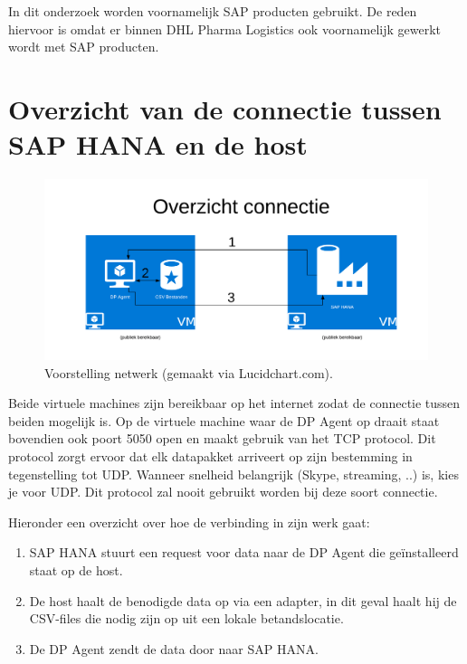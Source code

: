 In dit onderzoek worden voornamelijk SAP producten gebruikt. De reden hiervoor is omdat er binnen DHL Pharma Logistics ook voornamelijk gewerkt wordt met SAP producten.

\section{Overzicht van de connectie tussen SAP HANA en de host}
\begin{figure}[h]
	\centering
	\includegraphics[scale=0.5]{../images/AzureConnectieBP.png}
	\caption{Voorstelling netwerk (gemaakt via Lucidchart.com).}
	\label{fig:azureconn}
\end{figure}

Beide virtuele machines zijn bereikbaar op het internet zodat de connectie tussen beiden mogelijk is. Op de virtuele machine waar de DP Agent op draait staat bovendien ook poort 5050 open en maakt gebruik van het TCP protocol. Dit protocol zorgt ervoor dat elk datapakket arriveert op zijn bestemming in tegenstelling tot UDP. Wanneer snelheid belangrijk (Skype, streaming, ..) is, kies je voor UDP. Dit protocol zal nooit gebruikt worden bij deze soort connectie.

Hieronder een overzicht over hoe de verbinding in zijn werk gaat:

\begin{enumerate}
	\item SAP HANA stuurt een request voor data naar de DP Agent die geïnstalleerd staat op de host.
	\item De host haalt de benodigde data op via een adapter, in dit geval haalt hij de CSV-files die nodig zijn op uit een lokale betandslocatie.
	\item De DP Agent zendt de data door naar SAP HANA.
\end{enumerate}

